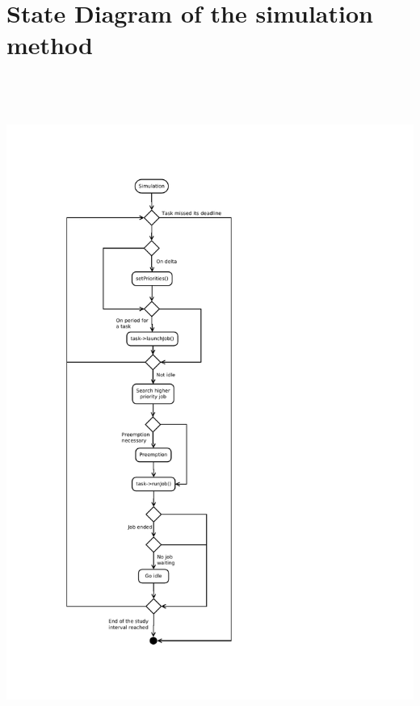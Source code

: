 \documentclass[a4paper,11pt]{article}
\begin{document}
    \section{State Diagram of the simulation method}\label{an:stateDiag}
    \includegraphics[height=22cm]{StateDiagram}
     
     
    
\end{document}
